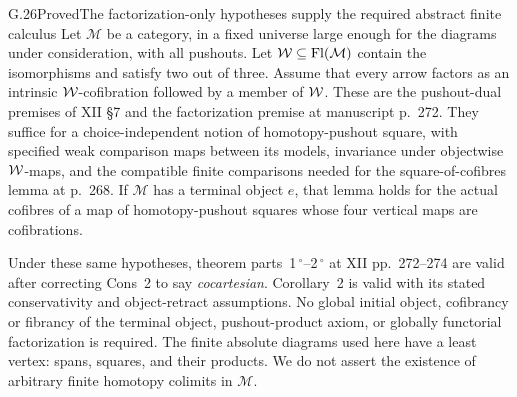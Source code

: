 \begin{claim}{G.26}{Proved}{The factorization-only hypotheses supply the required abstract finite calculus}
Let $\mathcal M$ be a category, in a fixed universe large enough for the diagrams under consideration, with all pushouts. Let $\mathcal{W}\subseteq\operatorname{Fl}(\mathcal M)$ contain the isomorphisms and satisfy two out of three. Assume that every arrow factors as an intrinsic $\mathcal{W}$-cofibration followed by a member of $\mathcal{W}$. These are the pushout-dual premises of XII \S7 and the factorization premise at manuscript p.~272. They suffice for a choice-independent notion of homotopy-pushout square, with specified weak comparison maps between its models, invariance under objectwise $\mathcal{W}$-maps, and the compatible finite comparisons needed for the square-of-cofibres lemma at p.~268. If $\mathcal M$ has a terminal object $e$, that lemma holds for the actual cofibres of a map of homotopy-pushout squares whose four vertical maps are cofibrations.

Under these same hypotheses, theorem parts~1\,$^\circ$--2\,$^\circ$ at XII pp.~272--274 are valid after correcting Cons~2 to say \emph{cocartesian}. Corollary~2 is valid with its stated conservativity and object-retract assumptions. No global initial object, cofibrancy or fibrancy of the terminal object, pushout-product axiom, or globally functorial factorization is required. The finite absolute diagrams used here have a least vertex: spans, squares, and their products. We do not assert the existence of arbitrary finite homotopy colimits in $\mathcal M$.
\end{claim}
